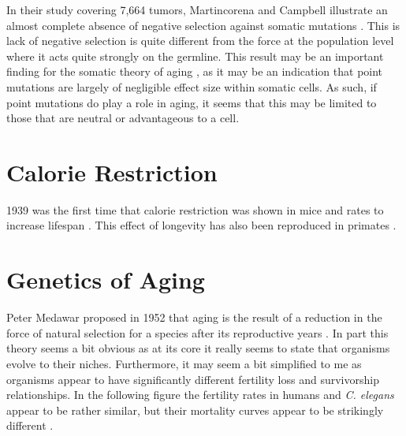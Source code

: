 \documentclass[]{book}
\newenvironment{Shaded}{\begin{snugshade}}{\end{snugshade}}
\newcommand{\KeywordTok}[1]{\textcolor[rgb]{0.13,0.29,0.53}{\textbf{#1}}}
\newcommand{\DataTypeTok}[1]{\textcolor[rgb]{0.13,0.29,0.53}{#1}}
\newcommand{\DecValTok}[1]{\textcolor[rgb]{0.00,0.00,0.81}{#1}}
\newcommand{\StringTok}[1]{\textcolor[rgb]{0.31,0.60,0.02}{#1}}
\newcommand{\OtherTok}[1]{\textcolor[rgb]{0.56,0.35,0.01}{#1}}
\newcommand{\OperatorTok}[1]{\textcolor[rgb]{0.81,0.36,0.00}{\textbf{#1}}}
\newcommand{\NormalTok}[1]{#1}
\begin{document}
In their study covering 7,664 tumors, Martincorena and Campbell
illustrate an almost complete absence of negative selection against
somatic mutations \citep{martincorena2017universal}. This is lack of
negative selection is quite different from the force at the population
level where it acts quite strongly on the germline. This result may be
an important finding for the somatic theory of aging
\citep{morley1995somatic}, as it may be an indication that point
mutations are largely of negligible effect size within somatic cells. As
such, if point mutations do play a role in aging, it seems that this may
be limited to those that are neutral or advantageous to a cell.

\section{Calorie Restriction}\label{calorie-restriction}

1939 was the first time that calorie restriction was shown in mice and
rates to increase lifespan \citep{mccay1935effect}. This effect of
longevity has also been reproduced in primates
\citep{pifferi2018caloric, mattison2017caloric}.

\section{Genetics of Aging}\label{genetics-of-aging}

Peter Medawar proposed in 1952 that aging is the result of a reduction
in the force of natural selection for a species after its reproductive
years \citep{medawar1952unsolved}. In part this theory seems a bit
obvious as at its core it really seems to state that organisms evolve to
their niches. Furthermore, it may seem a bit simplified to me as
organisms appear to have significantly different fertility loss and
survivorship relationships. In the following figure the fertility rates
in humans and \emph{C. elegans} appear to be rather similar, but their
mortality curves appear to be strikingly different
\citep{aguilaniu2015mysterious}.

\begin{Shaded}
\end{Shaded}
\end{document}
